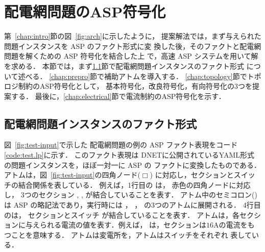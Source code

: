 ﻿\section{配電網問題のASP符号化}\label{chap:encode}

第~\ref{chap:intro}節の図~\ref{fig:arch}に示したように，
提案解法では，まず与えられた問題インスタンスを ASP のファクト形式に変
換した後，そのファクトと配電網問題を解くための ASP 符号化を結合した上
で，高速 ASP システム{\clingo}を用いて解を求める．
%
本節では，まず\ref{chap:fact}節で配電網問題インスタンスのファクト形式
について述べる．
\ref{chap:prepro}節で補助アトムを導入する．
\ref{chap:topology}節でトポロジ制約のASP符号化として，
基本符号化，改良符号化，有向符号化の3つを提案する．
最後に，\ref{chap:electrical}節で電流制約のASP符号化を示す．

\subsection{配電網問題インスタンスのファクト形式}\label{chap:fact}



図~\ref{fig:test-input}で示した
配電網問題の例の ASP ファクト表現をコード\ref{code:test.lp}に示す．
このファクト表現は
DNETに公開されているYAML形式の問題インスタンスを，ほぼ一対一に ASP の
ファクトに変換したものである．
%
アトムは，図~\ref{fig:test-input}の四角ノード($\Box$)
に対応し，セクションとスイッチの結合関係を表している．
例えば，1行目の
は，
赤色の四角ノードに対応し，
3つのセクション
, , 
が結合していることを表す．
アトム中のセミコロン(\code{;})は ASP の略記法であり，実行時には
，
，
の3つのアトムに展開される．
%
4行目のは，
セクションとスイッチ
が結合していることを表す．
%
アトムは，各セクションに与えられる電流の値を表す．例えば，
は，セクションは$16$Aの電流をもつことを意味する．
%
アトムは変電所を，アトムはスイッチをそれぞれ
表している．


